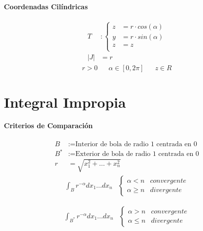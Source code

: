 \documentclass{article}
\begin{document}
\begin{multicols}{2}
      \paragraph{Coordenadas Cilíndricas}

        \begin{align*}
          T &:
          \begin{cases}
            z &= r \cdot cos(\alpha)\\
            y &= r \cdot sin(\alpha)\\
            z &= z \\
          \end{cases} \\
          \left|J\right| &= r
        \end{align*}
        \begin{align*}
          r > 0 &&  \alpha \in[0,2\pi] && z \in R
        \end{align*}

    \section{Integral Impropia}

      \paragraph{Criterios de Comparación}
        \begin{align*}
          B &:= \text{Interior de bola de radio 1 centrada en 0} \\
          B^* &:= \text{Exterior de bola de radio 1 centrada en 0} \\
          r &= \sqrt{x_1^2 + ... + x_n^2}
        \end{align*}
        \begin{align*}
          \int_B r^{-\alpha} dx_1...dx_n &
          \begin{cases}
            \alpha < n & convergente\\
            \alpha \geq n & divergente
          \end{cases}
        \end{align*}

        \begin{align*}
          \int_{B^*}r^{-\alpha} dx_1...dx_n &
          \begin{cases}
            \alpha > n & convergente\\
            \alpha \leq n & divergente
          \end{cases}
        \end{align*}

\end{multicols}
\end{document}
